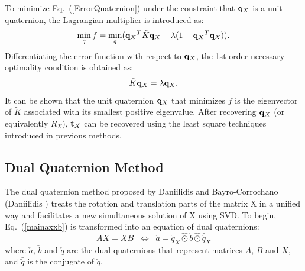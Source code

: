 \documentclass[twocolumn,10pt]{asme2ej}
\newcommand{\ttt}{{\bf t}}
\newcommand{\qq}{{\bf q}}
\begin{document}
To minimize  Eq.~(\ref{ErrorQuaternion}) under the constraint that $\qq_{X}$ is a unit quaternion, the Lagrangian multiplier is introduced as:
\begin{equation}
\min_{q} f = \min_{q}({\qq_{X}}^{T}\tilde{K}{\qq_{X}} + \lambda(1 - {\qq_{X}}^{T}{\qq_{X}})).
\label{ErrorLagrangeMultiplier}
\end{equation}
Differentiating the error function with respect to $\qq_{X}$, the 1st order necessary optimality condition is obtained as: 
\begin{equation}
\tilde{K}\qq_{X} = \lambda \qq_{X}.
\label{QuaternionEig}
\end{equation}
It can be shown that the unit quaternion $\qq_{X}$ that minimizes $f$ is the eigenvector of $\tilde{K}$ associated with its smallest positive eigenvalue. After recovering $\qq_{X}$ (or equivalently $R_{X}$), $\ttt_{X}$ can be recovered using the least square techniques introduced in previous methods.

\subsection{Dual Quaternion Method }
The dual quaternion method proposed by Daniilidis and Bayro-Corrochano \cite{daniilidis1996dual} (Daniilidis \cite{daniilidis1999hand}) treats the rotation and translation parts of the matrix X in a unified way and facilitates a new simultaneous solution of X using SVD. To begin, Eq.~(\ref{mainaxxb}) is transformed into an equation of dual quaternions: %
\begin{equation}
AX = XB 
\; \;
\Leftrightarrow
\; \;
\check{a} = \check{q}_{X}\hat{\odot}\check{b}\hat{\odot}\bar{\check{q}}_{X}
\label{DualQuaternion}
\end{equation}
where $\check{a}$, $\check{b}$ and $\check{q}$ are the dual quaternions that represent matrices $A$, $B$ and $X$, and $\bar{\check{q}}$ is the conjugate of $\check{q}$.
\end{document}
